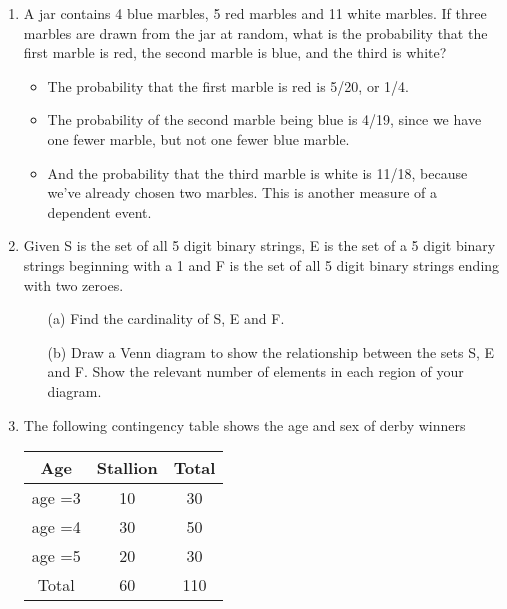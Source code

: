 \documentclass[a4paper,12pt]{article}
\begin{document}
\begin{enumerate}
\item A jar contains 4 blue marbles, 5 red marbles and 11 white marbles. If three marbles are drawn from the jar at random, what is the probability that the first marble is red, the second marble is blue, and the third is white?
\begin{itemize}
	\item The probability that the first marble is red is 5/20, or 1/4. 
	\item The probability of the second marble being blue is 4/19, since we have one fewer marble, but not one fewer blue marble. 
	\item And the probability that the third marble is white is 11/18, because we've already chosen two marbles. This is another measure of a dependent event.
\end{itemize}
\item 
Given S is the set of all 5 digit binary strings, E is the set of a 5 digit
binary strings beginning with a 1 and F is the set of all 5 digit binary strings ending
with two zeroes.
\begin{itemize}
	\item[(a)] Find the cardinality of S, E and F.
	\item[(b)] Draw a Venn diagram to show the relationship between the sets S, E and F.
	Show the relevant number of elements in each region of your diagram.
\end{itemize}

\item 


The following contingency table shows the age and sex of derby winners



\begin{center}

\begin{tabular}{ccc}
	Age	&	Stallion	&	Total	 \\ \hline
	
	
	age =3	&	10	&	30	 \\ \hline
	
	
	age =4 	&	30	&	50	 \\ \hline
	
	
	age =5	&	20	&	30	 \\ \hline
	
	
	Total	&	60	&	110	 \\ \hline
	
\end{tabular}

\end{center}






\end{enumerate}
\end{document}
